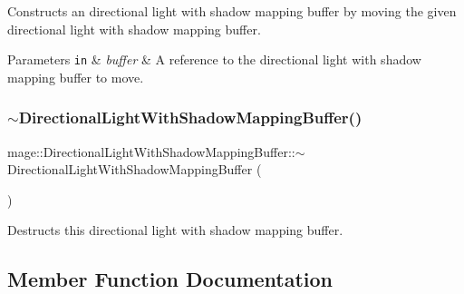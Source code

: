 Constructs an directional light with shadow mapping buffer by moving the given directional light with shadow mapping buffer.


\begin{DoxyParams}[1]{Parameters}
\mbox{\tt in}  & {\em buffer} & A reference to the directional light with shadow mapping buffer to move. \\
\hline
\end{DoxyParams}
\hypertarget{structmage_1_1_directional_light_with_shadow_mapping_buffer_aaf69f9a370b547844fe51ccebc791876}{}\label{structmage_1_1_directional_light_with_shadow_mapping_buffer_aaf69f9a370b547844fe51ccebc791876} 
\subsubsection{\texorpdfstring{$\sim$\+Directional\+Light\+With\+Shadow\+Mapping\+Buffer()}{~DirectionalLightWithShadowMappingBuffer()}}
{\footnotesize\ttfamily mage\+::\+Directional\+Light\+With\+Shadow\+Mapping\+Buffer\+::$\sim$\+Directional\+Light\+With\+Shadow\+Mapping\+Buffer (\begin{DoxyParamCaption}{ }\end{DoxyParamCaption})\hspace{0.3cm}{\ttfamily [default]}}

Destructs this directional light with shadow mapping buffer. 

\subsection{Member Function Documentation}
\hypertarget{structmage_1_1_directional_light_with_shadow_mapping_buffer_a9a166d9ce2e74442b98e0d02bcbf18b8}{}\label{structmage_1_1_directional_light_with_shadow_mapping_buffer_a9a166d9ce2e74442b98e0d02bcbf18b8} 
